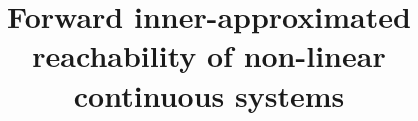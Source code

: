 \documentclass{sig-alternate-05-2015} %
\def\N{{\mathbb N}}
\def\R{{\mathbb R}}
\newcommand{\vv}{{\bf v}}
\def\F{{\Bbb F}}
\def\A{{\Bbb A}}
\def\I{{\Bbb I \Bbb R}}
\def\K{{\Bbb I \Bbb K}}
\begin{document}
\def\transpose#1{{}^t \! #1}
\def\bfm#1{\protect{\makebox{\boldmath $#1$}}}
\def\a {\bfm{a}}
\def\b {\bfm{b}}
\def\c {\bfm{c}}
\def\d {\bfm{d}}
\def\e {\bfm{e}}
\def\f {\bfm{f}}
\def\g {\bfm{g}}
\def\h {\bfm{h}}
\def\ii {\bfm{i}}       %
\def\j {\bfm{j}}
\def\k {\bfm{k}}
\def\l {\bfm{l}}
\def\m {\bfm{m}}
\def\n {\bfm{n}}
\def\o {\bfm{o}}
\def\p {\bfm{p}}
\def\q {\bfm{q}}
\def\r {\bfm{r}}
\def\s {\bfm{s}}
\def\t {\bfm{t}}
\def\u {\bfm{u}}
\def\vv {\bfm{v}}       %
\def\w {\bfm{w}}
\def\x {\bfm{x}}
\def\y {\bfm{y}}
\def\z {\bfm{z}}
\def\B {\bfm{B}}
\def\C {\bfm{C}}
\def\DD{\bfm{D}}        %
\def\E {\bfm{E}}
\def\G {\bfm{G}}
\def\H {\bfm{H}}
\def\J {\bfm{J}}
\def\L {\bfm{L}}
\def\M {\bfm{M}}
\def\N {\bfm{N}}
\def\O {\bfm{O}}
\def\P {\bfm{P}}
\def\Q {\bfm{Q}}
\def\S {\bfm{S}}
\def\T {\bfm{T}}
\def\U {\bfm{U}}
\def\V {\bfm{V}}
\def\W {\bfm{W}}
\def\X {\bfm{X}}
\def\Y {\bfm{Y}}


\title{Forward inner-approximated reachability  of non-linear continuous systems}
%
%
%
%
%
\end{document}
